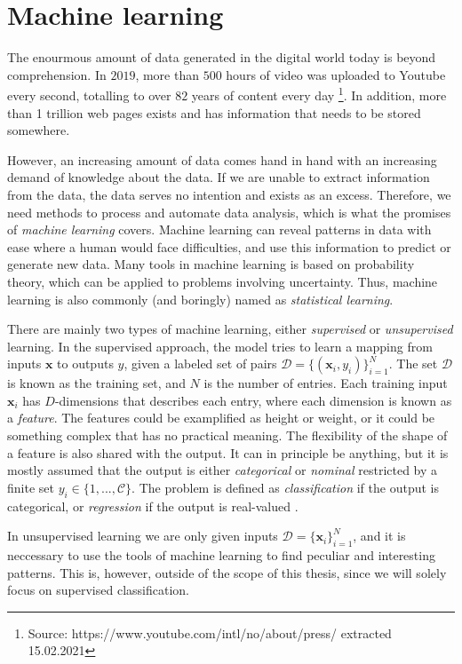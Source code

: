 \chapter{Machine learning}

The enourmous amount of data generated in the digital world today is beyond comprehension. In $2019$, more than $500$ hours of video was uploaded to Youtube every second, totalling to over $82$ years of content every day \footnote{Source: https://www.youtube.com/intl/no/about/press/ extracted 15.02.2021}. In addition, more than 1 trillion web pages exists and has information that needs to be stored somewhere.

However, an increasing amount of data comes hand in hand with an increasing demand of knowledge about the data. If we are unable to extract information from the data, the data serves no intention and exists as an excess. Therefore, we need methods to process and automate data analysis, which is what the promises of \textit{machine learning} covers. Machine learning can reveal patterns in data with ease where a human would face difficulties, and use this information to predict or generate new data. Many tools in machine learning is based on probability theory, which can be applied to problems involving uncertainty. Thus, machine learning is also commonly (and boringly) named as \textit{statistical learning}.

There are mainly two types of machine learning, either \textit{supervised} or \textit{unsupervised} learning. In the supervised approach, the model tries to learn a mapping from inputs $\textbf{x}$ to outputs $y$, given a labeled set of pairs $\mathcal{D}=\{(\textbf{x}_i, y_i)\}^N_{i=1}$. The set $\mathcal{D}$ is known as the training set, and $N$ is the number of entries. Each training input $\textbf{x}_i$ has $D$-dimensions that describes each entry, where each dimension is known as a \textit{feature}. The features could be examplified as height or weight, or it could be something complex that has no practical meaning. The flexibility of the shape of a feature is also shared with the output. It can in principle be anything, but it is mostly assumed that the output is either \textit{categorical} or \textit{nominal} restricted by a finite set $y_i \in \{1,...,\mathcal{C} \}$. The problem is defined as \textit{classification} if the output is categorical, or \textit{regression} if the output is real-valued \cite{Murphy2012}.

In unsupervised learning we are only given inputs $\mathcal{D}=\{\textbf{x}_i\}^N_{i=1}$, and it is neccessary to use the tools of machine learning to find peculiar and interesting patterns. This is, however, outside of the scope of this thesis, since we will solely focus on supervised classification.

